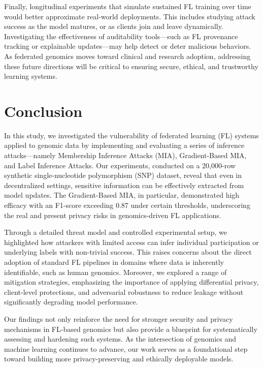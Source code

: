 \documentclass[conference]{IEEEtran}
\begin{document}
Finally, longitudinal experiments that simulate sustained FL training over time would better approximate real-world deployments. This includes studying attack success as the model matures, or as clients join and leave dynamically. Investigating the effectiveness of auditability tools—such as FL provenance tracking or explainable updates—may help detect or deter malicious behaviors. As federated genomics moves toward clinical and research adoption, addressing these future directions will be critical to ensuring secure, ethical, and trustworthy learning systems.

\section{Conclusion}

In this study, we investigated the vulnerability of federated learning (FL) systems applied to genomic data by implementing and evaluating a series of inference attacks—namely Membership Inference Attacks (MIA), Gradient-Based MIA, and Label Inference Attacks. Our experiments, conducted on a 20,000-row synthetic single-nucleotide polymorphism (SNP) dataset, reveal that even in decentralized settings, sensitive information can be effectively extracted from model updates. The Gradient-Based MIA, in particular, demonstrated high efficacy with an F1-score exceeding 0.87 under certain thresholds, underscoring the real and present privacy risks in genomics-driven FL applications.

Through a detailed threat model and controlled experimental setup, we highlighted how attackers with limited access can infer individual participation or underlying labels with non-trivial success. This raises concerns about the direct adoption of standard FL pipelines in domains where data is inherently identifiable, such as human genomics. Moreover, we explored a range of mitigation strategies, emphasizing the importance of applying differential privacy, client-level protections, and adversarial robustness to reduce leakage without significantly degrading model performance.

Our findings not only reinforce the need for stronger security and privacy mechanisms in FL-based genomics but also provide a blueprint for systematically assessing and hardening such systems. As the intersection of genomics and machine learning continues to advance, our work serves as a foundational step toward building more privacy-preserving and ethically deployable models.
\end{document}
